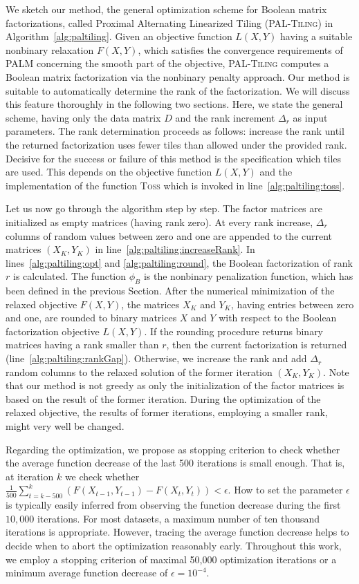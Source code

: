 We sketch our method, the general optimization scheme for Boolean matrix factorizations, called Proximal Alternating Linearized Tiling (\textsc{PAL-Tiling}) in Algorithm~\ref{alg:paltiling}. Given an objective function $L(X,Y)$ having a suitable nonbinary relaxation $F(X,Y)$, which satisfies the convergence requirements of PALM concerning the smooth part of the objective, \textsc{PAL-Tiling} computes a Boolean matrix factorization via the nonbinary penalty approach. Our method is suitable to automatically determine the rank of the factorization. We will discuss this feature thoroughly in the following two sections. Here, we state the general scheme, having only the data matrix $D$ and the rank increment $\Delta_r$ as input parameters. The rank determination proceeds as follows: increase the rank until the returned factorization uses fewer tiles than allowed under the provided rank. Decisive for the success or failure of this method is the specification which tiles are used. This depends on the objective function $L(X,Y)$ and the implementation of the function \textsc{Toss} which is invoked in line~\ref{alg:paltiling:toss}.

Let us now go through the algorithm step by step. 
The factor matrices are initialized as empty matrices (having rank zero). At every rank increase, $\Delta_r$ columns of random values between zero and one are appended to the current matrices $(X_K,Y_K)$ in line~\ref{alg:paltiling:increaseRank}. In lines~\ref{alg:paltiling:opt} and \ref{alg:paltiling:round}, the Boolean factorization of rank $r$ is calculated. The function $\phi_B$ is the nonbinary penalization function, which has been defined in the previous Section. After the numerical minimization of the relaxed objective $F(X,Y)$, the matrices $X_K$ and $Y_K$, having entries between zero and one, are rounded to binary matrices $X$ and $Y$ with respect to the Boolean factorization objective $L(X,Y)$. If the rounding procedure returns binary matrices having a rank smaller than $r$, then the current factorization is returned (line~\ref{alg:paltiling:rankGap}). Otherwise, we increase the rank and add $\Delta_r$ random columns to the relaxed solution of the former iteration $(X_K,Y_K)$. Note that our method is not greedy as only the initialization of the factor matrices is based on the result of the former iteration. During the optimization of the relaxed objective, the results of former iterations, employing a smaller rank, might very well be changed.

Regarding the optimization, we propose as stopping criterion to check whether the average function decrease of the last 500 iterations is small enough. That is, at iteration $k$ we check whether $\frac{1}{500}\sum_{t=k-500}^k(F(X_{t-1},Y_{t-1})-F(X_t,Y_t))<\epsilon$. How to set the parameter $\epsilon$ is typically easily inferred from observing the function decrease during the first $10,000$ iterations. For most datasets, a maximum number of ten thousand iterations is appropriate. However, tracing the average function decrease helps to decide when to abort the optimization reasonably early. Throughout this work, we employ a stopping criterion of maximal 50,000 optimization iterations or a minimum average function decrease of $\epsilon=10^{-4}$.

